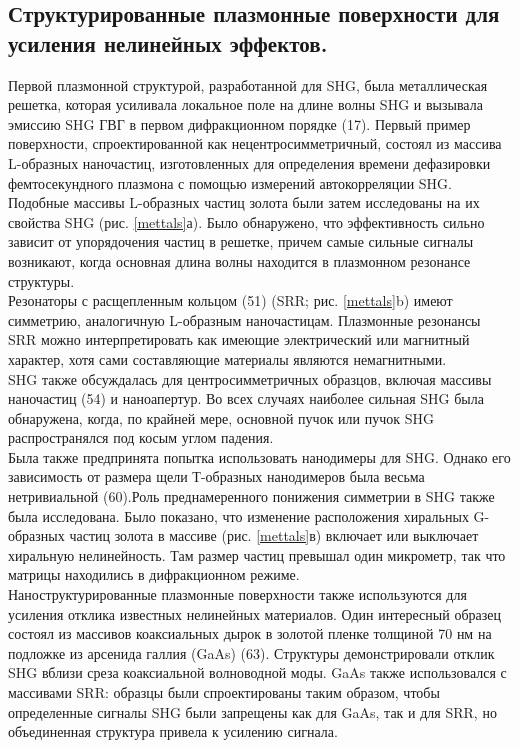 \subsection*{Структурированные плазмонные поверхности для усиления нелинейных эффектов.}
\hspace*{2mm}
Первой плазмонной структурой, разработанной для SHG, была металлическая решетка, которая усиливала локальное поле на длине волны SHG и вызывала эмиссию SHG ГВГ в первом дифракционном порядке (17). 
Первый пример поверхности, спроектированной как нецентросимметричный, состоял из массива L-образных наночастиц, изготовленных для определения времени дефазировки фемтосекундного плазмона с помощью измерений автокорреляции SHG. Подобные массивы L-образных частиц золота были затем исследованы на их свойства SHG (рис. \ref{mettals}а). Было обнаружено, что эффективность сильно зависит от упорядочения частиц в решетке, причем самые сильные сигналы возникают, когда основная длина волны находится в плазмонном резонансе структуры.
\\
\hspace*{2mm}
Резонаторы с расщепленным кольцом (51) (SRR; рис. \ref{mettals}b) имеют симметрию, аналогичную L-образным наночастицам. Плазмонные резонансы SRR можно интерпретировать как имеющие электрический или магнитный характер, хотя сами составляющие материалы являются немагнитными. 
\\
\hspace*{2mm}
SHG также обсуждалась для центросимметричных образцов, включая массивы наночастиц (54) и наноапертур. Во всех случаях наиболее сильная SHG была обнаружена, когда, по крайней мере, основной пучок или пучок SHG распространялся под косым углом падения.
\\
\hspace*{2mm}
Была также предпринята попытка использовать нанодимеры для SHG. Однако его зависимость от размера щели Т-образных нанодимеров была весьма нетривиальной (60).Роль преднамеренного понижения симметрии в SHG также была исследована. Было показано, что изменение расположения хиральных G-образных частиц золота в массиве (рис. \ref{mettals}в) включает или выключает хиральную нелинейность. Там размер частиц превышал один микрометр, так что матрицы находились в дифракционном режиме. 
\\
\hspace*{2mm}
Наноструктурированные плазмонные поверхности также используются для усиления отклика известных нелинейных материалов. Один интересный образец состоял из массивов коаксиальных дырок в золотой пленке толщиной 70 нм на подложке из арсенида галлия (GaAs)  (63). Структуры демонстрировали отклик SHG вблизи среза коаксиальной волноводной моды. GaAs также использовался с массивами SRR: образцы были спроектированы таким образом, чтобы определенные сигналы SHG были запрещены как для GaAs, так и для SRR, но объединенная структура привела к усилению сигнала. 
